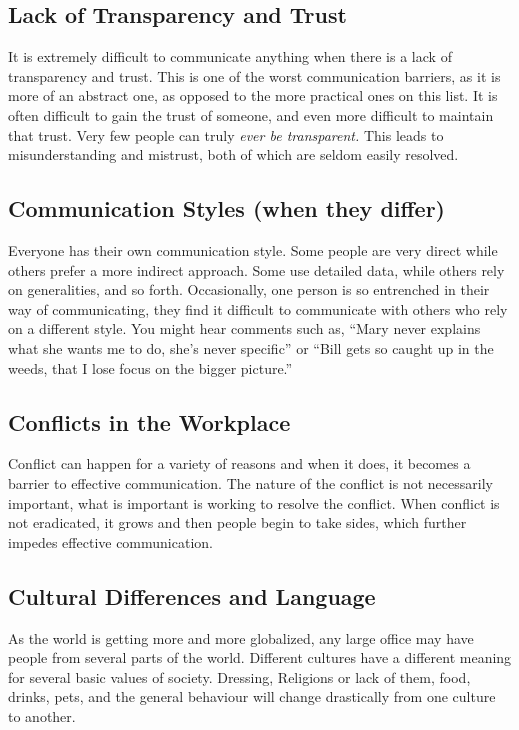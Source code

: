 \documentclass[11pt]{article}
\begin{document}
\subsection{Lack of Transparency and Trust}
It is extremely difficult to communicate anything when there is a lack of transparency and trust. This is one of the worst communication barriers, as it is more of an abstract one, as opposed to the more practical ones on this list. It is often difficult to gain the trust of someone, and even more difficult to maintain that trust. Very few people can truly \textit{ever be transparent.} This leads to misunderstanding and mistrust, both of which are seldom easily resolved. 

\subsection{Communication Styles (when they differ)}
Everyone has their own communication style. Some people are very direct while others prefer a more indirect approach. Some use detailed data, while others rely on generalities, and so forth. Occasionally, one person is so entrenched in their way of communicating, they find it difficult to communicate with others who rely on a different style. You might hear comments such as, “Mary never explains what she wants me to do, she’s never specific” or “Bill gets so caught up in the weeds, that I lose focus on the bigger picture.”

\subsection{Conflicts in the Workplace}
Conflict can happen for a variety of reasons and when it does, it becomes a barrier to effective communication. The nature of the conflict is not necessarily important, what is important is working to resolve the conflict. When conflict is not eradicated, it grows and then people begin to take sides, which further impedes effective communication.

\subsection{Cultural Differences and Language}
As the world is getting more and more globalized, any large office may have people from several parts of the world. Different cultures have a different meaning for several basic values of society. Dressing, Religions or lack of them, food, drinks, pets, and the general behaviour will change drastically from one culture to another.
\end{document}
